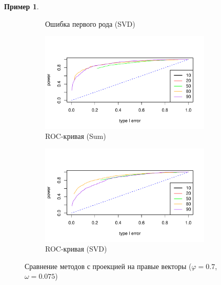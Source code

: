 \documentclass[specialist,
substylefile = spbu_report.rtx,
subf,href,colorlinks=true, 12pt]{disser}
\theoremstyle{definition}
\newtheorem{example}{Пример}
\begin{document}
\begin{example}
\begin{figure}[h!]
\begin{subfigure}[t]{0.5\textwidth}
		\caption{Ошибка первого рода (SVD)}
	\end{subfigure}
	\bigskip
	\begin{subfigure}[t]{0.5\textwidth}
		\centering
		\includegraphics[width=0.9\textwidth]{img/roc_sum_fa_omega0075.pdf}
		\caption{ROC-кривая (Sum)}
		\label{fig:sum_fa_r}
	\end{subfigure}\hspace{\fill}
	\begin{subfigure}[t]{0.5\textwidth}
		\centering
		\includegraphics[width=0.9\textwidth]{img/roc_mssa_fa.pdf}
		\caption{ROC-кривая (SVD)}
	\end{subfigure}
	\caption{Сравнение методов с проекцией на правые векторы ($\varphi=0.7$, $\omega=0.075$)}
	\label{fig:sum_fa}
\end{figure}


\end{example}
\end{document}
